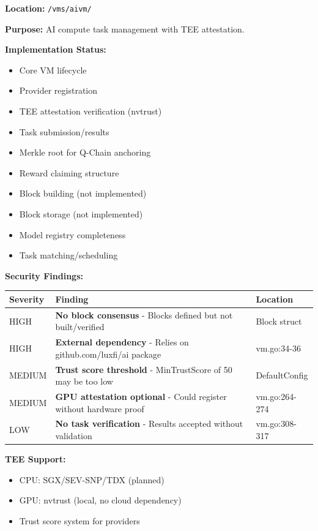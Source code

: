 \documentclass[
]{article}
\newcounter{none} %
\providecommand{\tightlist}{%
  \setlength{\itemsep}{0pt}\setlength{\parskip}{0pt}}
\begin{document}
\textbf{Location:} \texttt{/vms/aivm/}

\textbf{Purpose:} AI compute task management with TEE attestation.

\textbf{Implementation Status:}

\begin{itemize}
\tightlist
\item[$\boxtimes$]
  Core VM lifecycle
\item[$\boxtimes$]
  Provider registration
\item[$\boxtimes$]
  TEE attestation verification (nvtrust)
\item[$\boxtimes$]
  Task submission/results
\item[$\boxtimes$]
  Merkle root for Q-Chain anchoring
\item[$\boxtimes$]
  Reward claiming structure
\item[$\square$]
  Block building (not implemented)
\item[$\square$]
  Block storage (not implemented)
\item[$\square$]
  Model registry completeness
\item[$\square$]
  Task matching/scheduling
\end{itemize}

\textbf{Security Findings:}

{\def\LTcaptype{none} %
\begin{longtable}[]{@{}lll@{}}
\toprule\noalign{}
Severity & Finding & Location \\
\midrule\noalign{}
\endhead
\bottomrule\noalign{}
\endlastfoot
HIGH & \textbf{No block consensus} - Blocks defined but not
built/verified & Block struct \\
HIGH & \textbf{External dependency} - Relies on github.com/luxfi/ai
package & vm.go:34-36 \\
MEDIUM & \textbf{Trust score threshold} - MinTrustScore of 50 may be too
low & DefaultConfig \\
MEDIUM & \textbf{GPU attestation optional} - Could register without
hardware proof & vm.go:264-274 \\
LOW & \textbf{No task verification} - Results accepted without
validation & vm.go:308-317 \\
\end{longtable}
}

\textbf{TEE Support:}

\begin{itemize}
\tightlist
\item
  CPU: SGX/SEV-SNP/TDX (planned)
\item
  GPU: nvtrust (local, no cloud dependency)
\item
  Trust score system for providers
\end{itemize}
\end{document}
